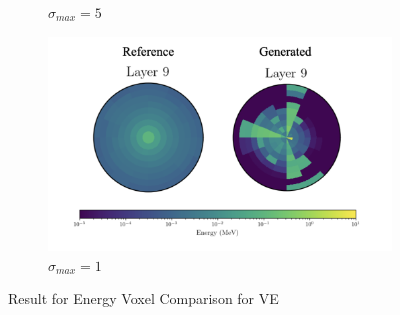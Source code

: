 \begin{figure}
\begin{subfigure}[b]{0.23\textwidth}
        \caption{$\sigma_{max}=5$}
        \label{fig:ve5_6}
    \end{subfigure}
    \hfill
    \begin{subfigure}[b]{0.23\textwidth}  %
        \centering
        \includegraphics[width=\textwidth]{Figures/ve1_6.png}
        \caption{$\sigma_{max}=1$}
        \label{fig:ve1_6}
    \end{subfigure}
    \caption{Result for Energy Voxel Comparison for VE}
\end{figure}

